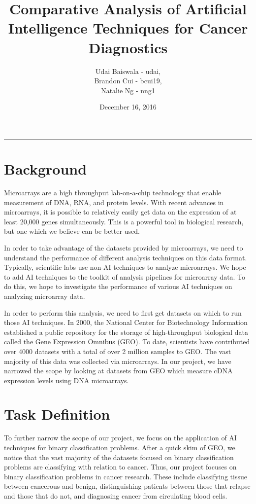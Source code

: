 \documentclass[12pt]{scrartcl}
\title{Comparative Analysis of Artificial Intelligence Techniques for Cancer Diagnostics}
\author{Udai Baiswala - udai, \\ 
Brandon Cui - bcui19, \\ 
Natalie Ng - nng1}
\date{December 16, 2016}
\begin{document}
  \maketitle

  \vspace{-0.3in}
  \rule{\linewidth}{0.4pt}
  
    \section{Background}
    Microarrays are a high throughput lab-on-a-chip technology that enable measurement of DNA, RNA, and protein levels. With recent advances in microarrays, it is possible to relatively easily get data on the expression of at least 20,000 genes simultaneously. This is a powerful tool in biological research, but one which we believe can be better used. 
    
    In order to take advantage of the datasets provided by microarrays, we need to understand the performance of different analysis techniques on this data format. Typically, scientific labs use non-AI techniques to analyze microarrays. We hope to add AI techniques to the toolkit of analysis pipelines for microarray data. To do this, we hope to investigate the performance of various AI techniques on analyzing microarray data. 
    
    In order to perform this analysis, we need to first get datasets on which to run those AI techniques. In 2000, the National Center for Biotechnology Information established a public repository for the storage of high-throughput biological data called the Gene Expression Omnibus (GEO). To date, scientists have contributed over 4000 datasets with a total of over 2 million samples to GEO. The vast majority of this data was collected via microarrays. In our project, we have narrowed the scope by looking at datasets from GEO which measure cDNA expression levels using DNA microarrays. 

    \section{Task Definition}    
    To further narrow the scope of our project, we focus on the application of AI techniques for binary classification problems. After a quick skim of GEO, we notice that the vast majority of the datasets focused on binary classification problems are classifying with relation to cancer. Thus, our project focuses on binary classification problems in cancer research. These include classifying tissue between cancerous and benign, distinguishing patients between those that relapse and those that do not, and diagnosing cancer from circulating blood cells. 
\end{document}
